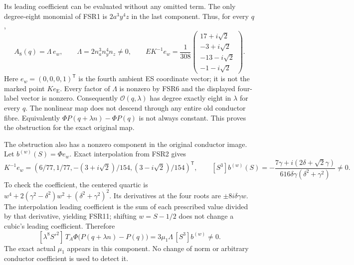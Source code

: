 \documentclass[11pt]{article}
\begin{document}
Its leading coefficient can be evaluated without any omitted term.
The only degree-eight monomial of FSR1 is $2a^3y^4z$ in the last
component. Thus, for every $q$,
\[
 A_8(q)=\Lambda\,e_w,\qquad
 \Lambda=2n_a^3n_y^4n_z\ne0,
 \qquad
 EK^{-1}e_w=\frac1{308}
 \begin{pmatrix}17+i\sqrt2\\-3+i\sqrt2\\-13-i\sqrt2\\-1-i\sqrt2\end{pmatrix}.
 \tag{FSR10}
\]
Here $e_w=(0,0,0,1)^{\mathsf T}$ is the fourth ambient ES
coordinate vector; it is not the marked point $Ke_{\mathrm E}$.
Every factor of $\Lambda$ is nonzero by FSR6 and the displayed
four-label vector is nonzero. Consequently $\mathcal O(q,\lambda)$
has degree exactly eight in $\lambda$ for every $q$. The nonlinear
map does not descend through any entire old conductor fibre.
Equivalently $\Phi P(q+\lambda n)-\Phi P(q)$ is not always
constant. This proves the obstruction for the exact original map.

The obstruction also has a nonzero component in the original conductor
image. Let
$b^{(w)}(S)=\Phi e_w$. Exact interpolation from FSR2 gives
\[
 K^{-1}e_w=
 (6/77,1/77,-(3+i\sqrt2)/154,(3-i\sqrt2)/154)^{\mathsf T},
 \qquad
 [S^3]b^{(w)}(S)=
 -\frac{7\gamma+i(2\delta+\sqrt2\gamma)}
          {616\delta\gamma(\delta^2+\gamma^2)}\ne0.
 \tag{FSR11}
\]
To check the coefficient, the centered quartic is
$w^4+2(\gamma^2-\delta^2)w^2+(\delta^2+\gamma^2)^2$.
Its derivatives at the four roots are $\pm8i\delta\gamma w$.
The interpolation leading coefficient is the sum of each prescribed
value divided by that derivative, yielding FSR11; shifting $w=S-1/2$
does not change a cubic's leading coefficient. Therefore
\[
 [\lambda^8S'^2]\,T_A\Phi\bigl(P(q+\lambda n)-P(q)\bigr)
       =3\mu_1\Lambda\,[S^3]b^{(w)}\ne0.
 \tag{FSR12}
\]
The exact actual $\mu_1$ appears in this component. No change of
norm or arbitrary conductor coefficient is used to detect it.
\end{document}

